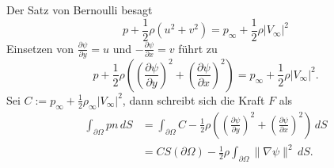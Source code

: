\documentclass[12pt]{exam}
\newcommand{\del}{\partial}
\begin{document}
\begin{questions}
    \begin{solution}
        Der Satz von Bernoulli besagt
        \begin{equation*}
            p + \frac{1}{2} \rho \left( u^2 + v^2 \right) = p_{\infty} + \frac{1}{2} \rho | V_{\infty} |^2
        \end{equation*}
        Einsetzen von $\frac{\del \psi}{\del y} = u$ und $-\frac{\del \psi}{\del x} = v$ führt zu
        \begin{equation*}
            p + \frac{1}{2} \rho \left( \left( \frac{\del \psi}{\del y} \right)^2 + \left( \frac{\del \psi}{\del x} \right)^2 \right) = p_{\infty} + \frac{1}{2} \rho | V_{\infty} |^2.
        \end{equation*}
        Sei $C := p_{\infty} + \frac{1}{2} \rho_{\infty} | V_{\infty} |^2$, dann schreibt sich die Kraft $F$ als
        \begin{align*}
            \int_{\del \Omega} pn \, dS &= \int_{\del \Omega} C - \frac{1}{2} \rho \left( \left( \frac{\del \psi}{\del y} \right)^2 + \left( \frac{\del \psi}{\del x} \right)^2 \right) \, dS \\
            &= C S(\del \Omega) - \frac{1}{2} \rho \int_{\del \Omega} \| \nabla \psi \|^2 \, dS.
        \end{align*}
        

\end{solution}
\end{questions}
\end{document}
